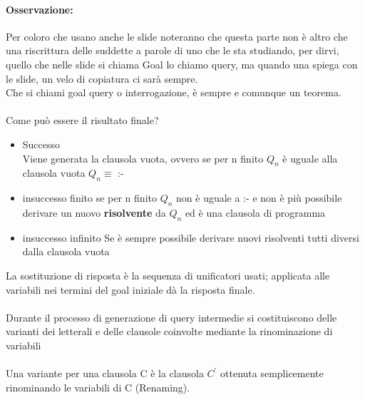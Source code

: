 \documentclass[12pt, a4paper, openany, oneside]{book}
\begin{document}
{\paragraph{Osservazione: } Per coloro che usano anche le slide noteranno che 
questa parte non è altro che una riscrittura delle suddette a parole di uno che
le sta studiando, per dirvi, quello che nelle slide si chiama Goal lo chiamo query,
ma quando una spiega con le slide, un velo di copiatura ci sarà sempre.\\
Che si chiami goal query o interrogazione, è sempre e comunque un teorema.
\\ \\
Come può essere il risultato finale? \\
\begin{itemize}
	\item Successo\\
	Viene generata la clausola vuota, ovvero se per n finito $Q_{n}$ è uguale 
	alla clausola vuota $Q_{n} \equiv $ :- 
	\item insuccesso finito
	se per n finito $Q_{n}$ non è uguale a :- e non è più possibile derivare un 
	nuovo \textbf{risolvente} da $Q_{n}$ ed è una clausola di programma
	\item insuccesso infinito
	Se è sempre possibile derivare nuovi risolventi tutti diversi dalla clausola
	vuota
\end{itemize}
La sostituzione di risposta è la sequenza di unificatori usati; applicata alle
variabili nei termini del goal iniziale dà la risposta finale.
\\ \\
Durante il processo di generazione di query intermedie si costituiscono delle 
varianti dei letterali e delle clausole coinvolte mediante la rinominazione di
variabili
\\ \\
Una variante per una clausola C è la clausola $C^{'}$ ottenuta semplicemente 
rinominando le variabili di C (Renaming).
}
\end{document}
